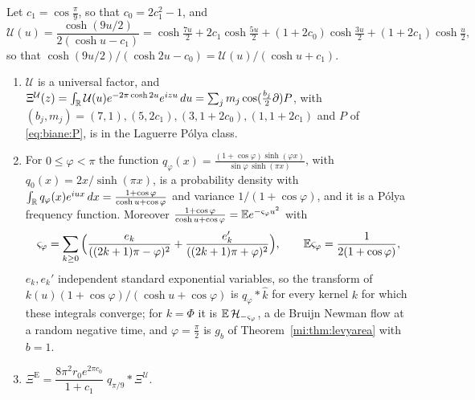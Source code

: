 \begin{proposition}\label{mi:prop:meixner}
Let $c_1=\cos\frac\pi9$, so that $c_0=2c_1^2-1$, and
\begin{equation}\label{mi:eq:nine}
\mathcal U(u)=\frac{\cosh(9u/2)}{2(\cosh u-c_1)}=\cosh\tfrac{7u}2+2c_1\cosh\tfrac{5u}2+(1+2c_0)\cosh\tfrac{3u}2+(1+2c_1)\cosh\tfrac u2 ,
\end{equation}
so that $\cosh(9u/2)/(\cosh2u-c_0)=\mathcal U(u)/(\cosh u+c_1)$.
\begin{enumerate}
\item[(i)] $\mathcal U$ is a universal factor, and $\Xi^{\mathcal U}(z)=\int_{\mathbb{R}}\mathcal U(u)e^{-2\pi\cosh2u}e^{izu}\,du=\sum_jm_j\cos(\frac{b_j}2\partial)P$, with $(b_j,m_j)=(7,1),(5,2c_1),(3,1+2c_0),(1,1+2c_1)$ and $P$ of \eqref{eq:biane:P}, is in the Laguerre P\'olya class.
\item[(ii)] For $0\le\varphi<\pi$ the function $q_\varphi(x)=\frac{(1+\cos\varphi)\sinh(\varphi x)}{\sin\varphi\,\sinh(\pi x)}$, with $q_0(x)=2x/\sinh(\pi x)$, is a probability density with $\int_{\mathbb{R}} q_\varphi(x)e^{iux}\,dx=\frac{1+\cos\varphi}{\cosh u+\cos\varphi}$ and variance $1/(1+\cos\varphi)$, and it is a P\'olya frequency function. Moreover $\frac{1+\cos\varphi}{\cosh u+\cos\varphi}=\mathbb{E} e^{-\varsigma_\varphi u^2}$ with
\[
\varsigma_\varphi=\sum_{k\ge0}\Big(\frac{e_k}{((2k+1)\pi-\varphi)^2}+\frac{e_k'}{((2k+1)\pi+\varphi)^2}\Big),\qquad\mathbb{E}\varsigma_\varphi=\frac1{2(1+\cos\varphi)},
\]
$e_k,e_k'$ independent standard exponential variables, so the transform of $k(u)(1+\cos\varphi)/(\cosh u+\cos\varphi)$ is $q_\varphi*\hat k$ for every kernel $k$ for which these integrals converge; for $k=\Phi$ it is $\mathbb{E}\,\mathcal H_{-\varsigma_\varphi}$, a de Bruijn Newman flow at a random negative time, and $\varphi=\frac\pi2$ is $g_b$ of Theorem~\ref{mi:thm:levyarea} with $b=1$.
\item[(iii)] $\Xi^{\mathrm E}=\dfrac{8\pi^2r_0e^{2\pi c_0}}{1+c_1}\;q_{\pi/9}*\Xi^{\mathcal U}$.
\end{enumerate}
\end{proposition}

